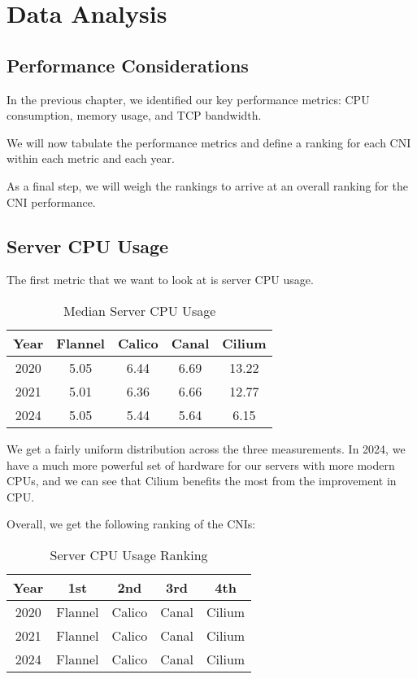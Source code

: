 %
%

\pagebreak
\section{Data Analysis}

\onehalfspacing

\subsection{Performance Considerations}

In the previous chapter, we identified our key performance metrics: CPU consumption, memory usage, and TCP bandwidth. 

We will now tabulate the performance metrics and define a ranking for each CNI within each metric and each year.

As a final step, we will weigh the rankings to arrive at an overall ranking for the CNI performance.

\subsection{Server CPU Usage}

The first metric that we want to look at is server CPU usage.

\begin{table}[H]
\caption{Median Server CPU Usage}
\begin{tabular}{|c | c | c | c | c|} 
 \hline
 Year & Flannel & Calico & Canal & Cilium \\
 \hline\hline
 2020 & 5.05 & 6.44 & 6.69 & 13.22 \\ 
 \hline
 2021 & 5.01 & 6.36 & 6.66 & 12.77 \\
 \hline
 2024 & 5.05 & 5.44 & 5.64 & 6.15 \\
 \hline
\end{tabular}
\label{tab:cpu}
\end{table}

We get a fairly uniform distribution across the three measurements. In 2024, we have a much more powerful set of hardware for our servers with more modern CPUs, and we can see that Cilium benefits the most from the improvement in CPU.

Overall, we get the following ranking of the CNIs:

\begin{table}[H]
\caption{Server CPU Usage Ranking}
\begin{tabular}{|c | c | c | c | c|} 
 \hline
 Year & 1st & 2nd & 3rd & 4th \\
 \hline\hline
 2020 & Flannel & Calico & Canal & Cilium \\ 
 \hline
 2021 & Flannel & Calico & Canal & Cilium \\
 \hline
 2024 & Flannel & Calico & Canal & Cilium \\
 \hline
\end{tabular}
\label{tab:cpu-r}
\end{table}

